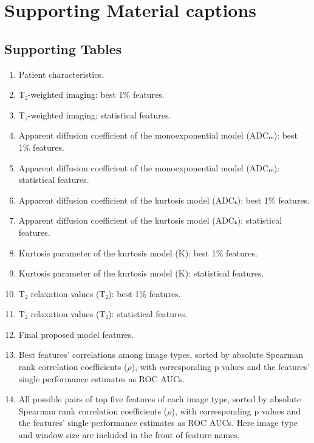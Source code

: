 \newcommand{\fig}[2]{\item Patient #1: #2 map, prostate mask, lesion masks.}
\newcommand{\figADCm}[1]{\fig{#1}{ADCₘ}}
\newcommand{\figTtw}[1]{\fig{#1}{T₂w}}
\newcommand{\figTt}[1]{\fig{#1}{T₂}}

\newcommand{\histology}[2]{\item Patient #1: #2.}
\newcommand{\pink}[1]{\histology{#1}{prostatectomy section}}


\section{Supporting Material captions}

\subsection{Supporting Tables}

\begin{enumerate}
\item Patient characteristics.
\item T₂-weighted imaging: best 1\% features.
\item T₂-weighted imaging: statistical features.
\item Apparent diffusion coefficient of the monoexponential model (ADCₘ): best
  1\% features.
\item Apparent diffusion coefficient of the monoexponential model (ADCₘ):
  statistical features.
\item Apparent diffusion coefficient of the kurtosis model (ADCₖ): best 1\%
  features.
\item Apparent diffusion coefficient of the kurtosis model (ADCₖ): statistical
  features.
\item Kurtosis parameter of the kurtosis model (K): best 1\% features.
\item Kurtosis parameter of the kurtosis model (K): statistical features.
\item T₂ relaxation values (T₂): best 1\% features.
\item T₂ relaxation values (T₂): statistical features.
\item Final proposed model features.
\item Best features' correlations among image types, sorted by absolute Spearman
  rank correlation coefficients ($\rho$), with corresponding p values and the
  features' single performance estimates as ROC AUCs.
\item All possible pairs of top five features of each image type, sorted by
  absolute Spearman rank correlation coefficients ($\rho$), with corresponding p
  values and the features' single performance estimates as ROC AUCs. Here image
  type and window size are included in the front of feature names.
\end{enumerate}


